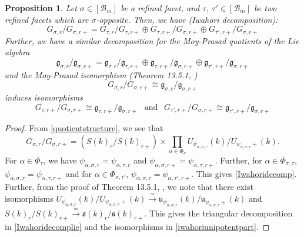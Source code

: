 \documentclass[11 pt]{article}
\numberwithin{equation}{subsection}
\newtheorem{proposition}[theorem]{Proposition}
\theoremstyle{definition}
\theoremstyle{remark}
\theoremstyle{conjecture}
\newcommand{\fg}{\mathfrak g}
\newcommand{\fu}{\mathfrak u}
\newcommand{\fs}{\mathfrak s}
\newcommand{\B}{\mathcal{B}}
\begin{document}
\begin{proposition}\label{Iwahorifracdepthprop}
    Let $\sigma \in [\B_m]$ be a refined facet, and $\tau,\;\tau'\in [\B_m]$ be two refined facets which are $\sigma$-opposite. Then, we have (Iwahori decomposition):
    \begin{equation}\label{Iwahoridecomp}
      G_{\sigma,r}/G_{\sigma,r+} = G_{\tau,r}/G_{\tau,r+}\oplus G_{\tau,r+}/G_{\sigma,r+}\oplus G_{\tau',r+}/G_{\sigma,r+}  
    \end{equation}
    Further, we have a similar decomposition for the Moy-Prasad quotients of the Lie algebra
     \begin{equation}\label{Iwahoridecomplie}
      \fg_{\sigma,r}/\fg_{\sigma,r+} = \fg_{\tau,r}/\fg_{\tau,r+}\oplus \fg_{\tau,r+}/\fg_{\sigma,r+}\oplus \fg_{\tau',r+}/\fg_{\sigma,r+}  
    \end{equation}
    and the Moy-Prasad isomorphism (Theorem 13.5.1, \cite{KP23} )
    \begin{equation}\label{MPisom}
         G_{\sigma,r}/G_{\sigma,r+} \cong \fg_{\sigma,r}/\fg_{\sigma,r+}
    \end{equation}
    induces isomorphisms 
    \begin{equation}\label{iwahoriunipotentpart}
        G_{\tau,r+}/G_{\sigma,r+} \cong \fg_{\tau,r+}/\fg_{\sigma,r+} \:\:\text{  and   } \: \:G_{\tau',r+}/G_{\sigma,r+} \cong \fg_{\tau',r+}/\fg_{\sigma,r+}
    \end{equation}
\end{proposition}
\begin{proof}
    From \eqref{quotientstructure}, we see that 
    \[
    G_{\sigma,r}/G_{\sigma,r+}= \left(S(k)_r/S(k)_{r+}\right) \times \prod_{\alpha \in \Phi_\sigma } U _{\psi_{\alpha,\sigma,r}}(k)/U _{\psi_{\alpha,\sigma,r}+}(k).
    \]
For $\alpha \in \Phi_\tau$, we have $\psi_{\alpha,\sigma,r}=\psi_{\alpha,\tau,r}$ and $\psi_{\alpha,\sigma,r+}=\psi_{\alpha,\tau,r+}$. Further, for $\alpha \in \Phi_{\sigma,\tau}$, $\psi_{\alpha,\sigma,r}=\psi_{\alpha,\tau,r+}$ and for $\alpha \in \Phi_{\sigma,\tau'}$, $\psi_{\alpha,\sigma,r}=\psi_{\alpha,\tau',r+}$. This gives \eqref{Iwahoridecomp}. Further, from the proof of Theorem 13.5.1, \cite{KP23}, we note that there exist isomorphisms $U_{\psi_{\alpha,\sigma,r}}(k)/U _{\psi_{\alpha,\sigma,r}+}(k) \xrightarrow{\simeq} \fu_{\psi_{\alpha,\sigma,r}}(k)/\fu_{\psi_{\alpha,\sigma,r}+}(k)$ and $S(k)_r/S(k)_{r+}\xrightarrow{\simeq} \fs(k)_{r}/\fs(k)_{r+} $. This gives the triangular decomposition in \eqref{Iwahoridecomplie} and the isomorphisms in \eqref{iwahoriunipotentpart}. 
\end{proof}
\end{document}
